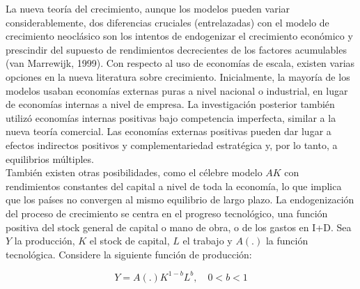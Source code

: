 La nueva teoría del crecimiento, aunque los modelos pueden variar considerablemente, dos diferencias cruciales (entrelazadas) con el modelo de crecimiento neoclásico son los intentos de endogenizar el crecimiento económico y prescindir del supuesto de rendimientos decrecientes de los factores acumulables (van Marrewijk, 1999). Con respecto al uso de economías de escala, existen varias opciones en la nueva literatura sobre crecimiento. Inicialmente, la mayoría de los modelos usaban economías externas puras a nivel nacional o industrial, en lugar de economías internas a nivel de empresa. La investigación posterior también utilizó economías internas positivas bajo competencia imperfecta, similar a la nueva teoría comercial. Las economías externas positivas pueden dar lugar a efectos indirectos positivos y complementariedad estratégica y, por lo tanto, a equilibrios múltiples.\\
También existen otras posibilidades, como el célebre modelo $AK$ con rendimientos constantes del capital a nivel de toda la economía, lo que implica que los países no convergen al mismo equilibrio de largo plazo. La endogenización del proceso de crecimiento se centra en el progreso tecnológico, una función positiva del stock general de capital o mano de obra, o de los gastos en I+D. Sea $Y$ la producción, $K$ el stock de capital, $L$ el trabajo y $A(.)$ la función tecnológica. Considere la siguiente función de producción:

$$Y=A(.)K^{1-b}L^b,\quad 0<b<1$$

